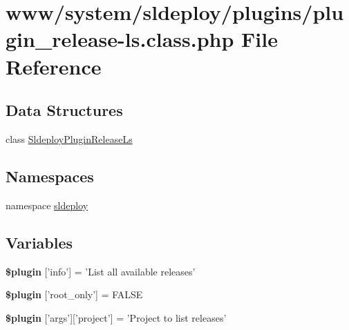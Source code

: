 \hypertarget{plugin__release-ls_8class_8php}{
\section{www/system/sldeploy/plugins/plugin\_\-release-\/ls.class.php File Reference}
\label{plugin__release-ls_8class_8php}
}
\subsection*{Data Structures}
\begin{DoxyCompactItemize}
\item 
class \hyperlink{class_sldeploy_plugin_release_ls}{SldeployPluginReleaseLs}
\end{DoxyCompactItemize}
\subsection*{Namespaces}
\begin{DoxyCompactItemize}
\item 
namespace \hyperlink{namespacesldeploy}{sldeploy}
\end{DoxyCompactItemize}
\subsection*{Variables}
\begin{DoxyCompactItemize}
\item 
\hypertarget{plugin__release-ls_8class_8php_a95edf69ebbeaeedb03bab3bb010f2af9}{
{\bfseries \$plugin} \mbox{[}'info'\mbox{]} = 'List all available releases'}
\label{plugin__release-ls_8class_8php_a95edf69ebbeaeedb03bab3bb010f2af9}

\item 
\hypertarget{plugin__release-ls_8class_8php_a1d302084fa15e3efe6c843cbb5096985}{
{\bfseries \$plugin} \mbox{[}'root\_\-only'\mbox{]} = FALSE}
\label{plugin__release-ls_8class_8php_a1d302084fa15e3efe6c843cbb5096985}

\item 
\hypertarget{plugin__release-ls_8class_8php_a1e79ee412498bfe3517d2984ab4c272f}{
{\bfseries \$plugin} \mbox{[}'args'\mbox{]}\mbox{[}'project'\mbox{]} = 'Project to list releases'}
\label{plugin__release-ls_8class_8php_a1e79ee412498bfe3517d2984ab4c272f}

\end{DoxyCompactItemize}


